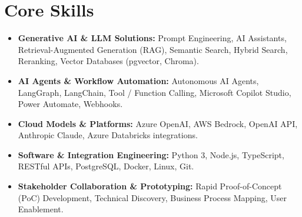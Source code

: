\documentclass[a4paper,10pt]{article}
\begin{document}
\section{Core Skills}
\begin{itemize}
  \item \textbf{Generative AI \& LLM Solutions:} Prompt Engineering, AI Assistants, Retrieval-Augmented Generation (RAG), Semantic Search, Hybrid Search, Reranking, Vector Databases (pgvector, Chroma).
  \item \textbf{AI Agents \& Workflow Automation:} Autonomous AI Agents, LangGraph, LangChain, Tool / Function Calling, Microsoft Copilot Studio, Power Automate, Webhooks.
  \item \textbf{Cloud Models \& Platforms:} Azure OpenAI, AWS Bedrock, OpenAI API, Anthropic Claude, Azure Databricks integrations.
  \item \textbf{Software \& Integration Engineering:} Python 3, Node.js, TypeScript, RESTful APIs, PostgreSQL, Docker, Linux, Git.
  \item \textbf{Stakeholder Collaboration \& Prototyping:} Rapid Proof-of-Concept (PoC) Development, Technical Discovery, Business Process Mapping, User Enablement.
\end{itemize}
\end{document}
